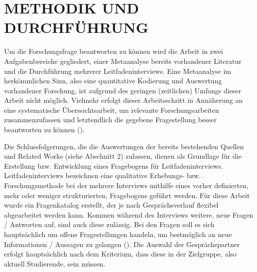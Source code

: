 \documentclass[10pt]{article}
\newcommand{\zit}[1]{(\cite{#1})}
\begin{document}
\section{METHODIK UND DURCHFÜHRUNG}
Um die Forschungsfrage beantworten zu können wird die Arbeit in zwei Aufgabenbereiche gegliedert, einer Metaanalyse bereits vorhandener Literatur und die Durchführung mehrerer Leitfadeninterviews. 
Eine Metaanalyse im herkömmlichen Sinn, also eine quantitative Kodierung und Auswertung vorhandener Forschung, ist aufgrund des geringen (zeitlichen) Umfangs dieser Arbeit nicht möglich. Vielmehr erfolgt dieser Arbeitsschritt in Annäherung an eine systematische Überssichtsarbeit, um relevante Forschungsarbeiten zusammenzufassen und letztendlich die gegebene Fragestellung besser beantworten zu können \zit{Metaanalyse}.

Die Schlussfolgerungen, die die Auswertungen der bereits bestehenden Quellen und Related Works (siehe Abschnitt 2) zulassen, dienen als Grundlage für die Erstellung bzw. Entwicklung eines Fragebogens für Leitfadeninterviews. Leitfadeninterviews bezeichnen eine qualitative Erhebungs- bzw. Forschungsmethode bei der mehrere Interviews mithilfe eines vorher definierten, mehr oder weniger strukturierten, Fragebogens geführt werden. Für diese Arbeit wurde ein Fragenkatalog erstellt, der je nach Gesprächsverlauf flexibel abgearbeitet werden kann. Kommen während des Interviews weitere, neue Fragen / Antworten auf, sind auch diese zulässig. Bei den Fragen soll es sich hauptsächlich um offene Fragestellungen handeln, um bestmöglich an neue Informationen / Aussagen zu gelangen \zit{Leitfadeninterview}.
Die Auswahl der Gesprächspartner erfolgt hauptsächlich nach dem Kriterium, dass diese in der Zielgruppe, also aktuell Studierende, sein müssen.
\end{document}
